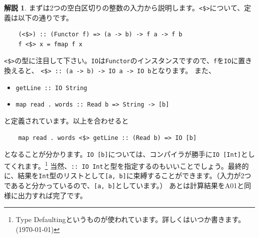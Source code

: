 \documentclass[12pt,a4paper,dvipdfmx,fleqn]{article}%
\theoremstyle{definition}
\theoremstyle{definition}
\newtheorem*{ans*}{解説}
\theoremstyle{definition}
\newcommand{\ttt}[1]{\texttt{#1}} %
\begin{document}
\begin{ans*}
    まずは2つの空白区切りの整数の入力から説明します。\ttt{<\$>}について、定義は以下の通りです。
    \begin{verbatim}
    (<$>) :: (Functor f) => (a -> b) -> f a -> f b
    f <$> x = fmap f x
    \end{verbatim}
    \vspace*{-4mm}
    \ttt{<\$>}の型に注目して下さい。\ttt{IO}は\ttt{Functor}のインスタンスですので、\ttt{f}を\ttt{IO}に置き換えると、
    \ttt{<\$> :: (a -> b) -> IO a -> IO b}となります。
    また、
    \begin{itemize}
        \item [] \ttt{getLine :: IO String}
        \item [] \ttt{map read . words :: Read b => String -> [b]}
    \end{itemize}
    と定義されています。以上を合わせると
    \begin{verbatim}
    map read . words <$> getLine :: (Read b) => IO [b]
    \end{verbatim}
    \vspace*{-4mm}
    となることが分かります。\ttt{IO [b]}については、コンパイラが勝手に\ttt{IO [Int]}としてくれます。\footnote{Type Defaultingというものが使われています。詳しくはいつか書きます。(\today)}
    当然、\ttt{:: IO {Int}}と型を指定するのもいいことでしょう。最終的に、結果を\ttt{Int}型のリストとして\ttt{[a, b]}に束縛することができます。（\chub 入力が2つであると分かっているので、\ttt{[a, b]}としています。）
    あとは計算結果をA01と同様に出力すれば完了です。
\end{ans*}
\end{document}
